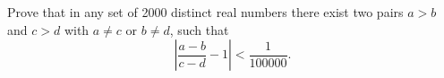 Prove that in any set of 2000 distinct real numbers there exist two pairs $a > b$ and $c > d$ with $a \neq c$ or $b \neq d$, such that
\[
\left| \frac{a-b}{c-d} - 1 \right| < \frac{1}{100000}.
\]
